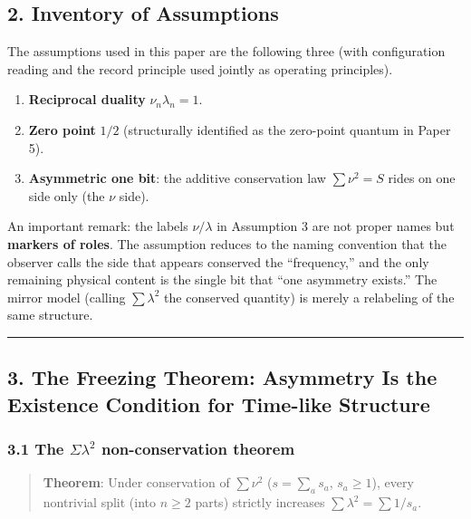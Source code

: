 \documentclass[
]{article}
\providecommand{\tightlist}{%
  \setlength{\itemsep}{0pt}\setlength{\parskip}{0pt}}
\begin{document}
\subsection{2. Inventory of Assumptions}\label{inventory-of-assumptions}

The assumptions used in this paper are the following three (with
configuration reading and the record principle used jointly as operating
principles).

\begin{enumerate}
\def\labelenumi{\arabic{enumi}.}
\tightlist
\item
  \textbf{Reciprocal duality} \(\nu_n\lambda_n=1\).
\item
  \textbf{Zero point} \(1/2\) (structurally identified as the zero-point
  quantum in Paper 5).
\item
  \textbf{Asymmetric one bit}: the additive conservation law
  \(\sum\nu^2=S\) rides on one side only (the \(\nu\) side).
\end{enumerate}

An important remark: the labels \(\nu/\lambda\) in Assumption 3 are not
proper names but \textbf{markers of roles}. The assumption reduces to
the naming convention that the observer calls the side that appears
conserved the ``frequency,'' and the only remaining physical content is
the single bit that ``one asymmetry exists.'' The mirror model (calling
\(\sum\lambda^2\) the conserved quantity) is merely a relabeling of the
same structure.

\begin{center}\rule{0.5\linewidth}{0.5pt}\end{center}

\subsection{3. The Freezing Theorem: Asymmetry Is the Existence
Condition for Time-like
Structure}\label{the-freezing-theorem-asymmetry-is-the-existence-condition-for-time-like-structure}

\subsubsection{\texorpdfstring{3.1 The \(\Sigma\lambda^2\)
non-conservation
theorem}{3.1 The \textbackslash Sigma\textbackslash lambda\^{}2 non-conservation theorem}}\label{the-sigmalambda2-non-conservation-theorem}

\begin{quote}
\textbf{Theorem}: Under conservation of \(\sum\nu^2\) (\(s=\sum_a s_a\),
\(s_a\ge1\)), every nontrivial split (into \(n\ge2\) parts) strictly
increases \(\sum\lambda^2=\sum 1/s_a\).
\end{quote}
\end{document}
